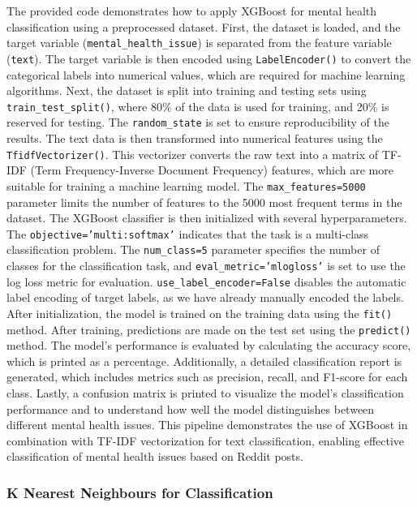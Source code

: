 \noindent
The provided code demonstrates how to apply XGBoost for mental health classification using a preprocessed dataset. First, the dataset is loaded, and the target variable (\texttt{mental\_health\_issue}) is separated from the feature variable (\texttt{text}). The target variable is then encoded using \texttt{LabelEncoder()} to convert the categorical labels into numerical values, which are required for machine learning algorithms. Next, the dataset is split into training and testing sets using \texttt{train\_test\_split()}, where 80\% of the data is used for training, and 20\% is reserved for testing. The \texttt{random\_state} is set to ensure reproducibility of the results. The text data is then transformed into numerical features using the \texttt{TfidfVectorizer()}. This vectorizer converts the raw text into a matrix of TF-IDF (Term Frequency-Inverse Document Frequency) features, which are more suitable for training a machine learning model. The \texttt{max\_features=5000} parameter limits the number of features to the 5000 most frequent terms in the dataset. The XGBoost classifier is then initialized with several hyperparameters. The \texttt{objective='multi:softmax'} indicates that the task is a multi-class classification problem. The \texttt{num\_class=5} parameter specifies the number of classes for the classification task, and \texttt{eval\_metric='mlogloss'} is set to use the log loss metric for evaluation. \texttt{use\_label\_encoder=False} disables the automatic label encoding of target labels, as we have already manually encoded the labels. After initialization, the model is trained on the training data using the \texttt{fit()} method. After training, predictions are made on the test set using the \texttt{predict()} method. The model's performance is evaluated by calculating the accuracy score, which is printed as a percentage. Additionally, a detailed classification report is generated, which includes metrics such as precision, recall, and F1-score for each class. Lastly, a confusion matrix is printed to visualize the model's classification performance and to understand how well the model distinguishes between different mental health issues. This pipeline demonstrates the use of XGBoost in combination with TF-IDF vectorization for text classification, enabling effective classification of mental health issues based on Reddit posts.


\subsubsection{K Nearest Neighbours for Classification}

